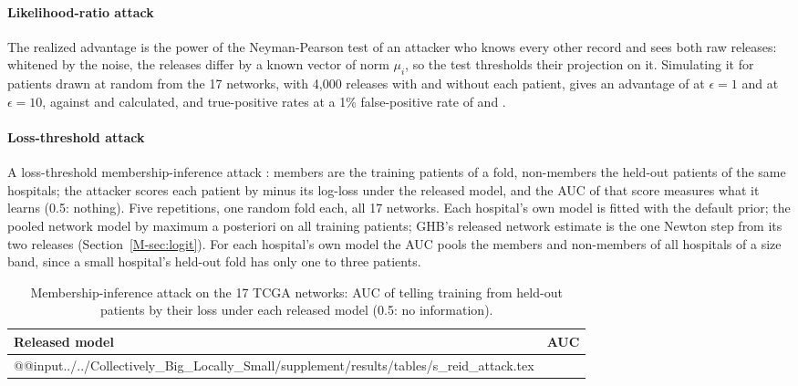\documentclass[acmsmall,screen,nonacm]{acmart}
\theoremstyle{acmdefinition}
\begin{document}
\paragraph{Likelihood-ratio attack} The realized advantage is the power of the Neyman-Pearson test of an attacker who knows every other record and sees both raw releases: whitened by the noise, the releases differ by a known vector of norm $\mu_i$, so the test thresholds their projection on it. Simulating it for \SimReidLRPatients{} patients drawn at random from the 17 networks, with 4,000 releases with and without each patient, gives an advantage of \SimReidOneLRAdv{} at $\epsilon=1$ and \SimReidTenLRAdv{} at $\epsilon=10$, against \SimReidOneLRAna{} and \SimReidTenLRAna{} calculated, and true-positive rates at a 1\% false-positive rate of \SimReidOneLRTpr{} and \SimReidTenLRTpr.

\paragraph{Loss-threshold attack} A loss-threshold membership-inference attack \cite{shokri2017membership}: members are the training patients of a fold, non-members the held-out patients of the same hospitals; the attacker scores each patient by minus its log-loss under the released model, and the AUC of that score measures what it learns (0.5: nothing). Five repetitions, one random fold each, all 17 networks. Each hospital's own model is fitted with the default prior; the pooled network model by maximum a posteriori on all training patients; GHB's released network estimate is the one Newton step from its two releases (Section~\ref{M-sec:logit}). For each hospital's own model the AUC pools the members and non-members of all hospitals of a size band, since a small hospital's held-out fold has only one to three patients.

\begin{table}[ht]
\centering
\caption{Membership-inference attack on the 17 TCGA networks: AUC of telling training from held-out patients by their loss under each released model (0.5: no information).}
\label{tab:reid-attack}
\scriptsize
\begin{tabular}{@{}lr@{}}
\toprule
Released model & AUC\\
\midrule
\csname @@input\endcsname../../Collectively_Big_Locally_Small/supplement/results/tables/s_reid_attack.tex 
\bottomrule
\end{tabular}
\end{table}
\end{document}
